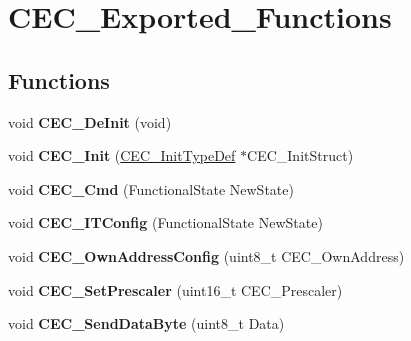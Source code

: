 \hypertarget{group__CEC__Exported__Functions}{
\section{CEC\_\-Exported\_\-Functions}
\label{group__CEC__Exported__Functions}
}
\subsection*{Functions}
\begin{DoxyCompactItemize}
\item 
\hypertarget{group__CEC__Exported__Functions_ga604c3b15b51a46303c201fa3deac2212}{
void {\bfseries CEC\_\-DeInit} (void)}
\label{group__CEC__Exported__Functions_ga604c3b15b51a46303c201fa3deac2212}

\item 
\hypertarget{group__CEC__Exported__Functions_gaf48aee745a16370372b3eaa7cf3ed22b}{
void {\bfseries CEC\_\-Init} (\hyperlink{structCEC__InitTypeDef}{CEC\_\-InitTypeDef} $\ast$CEC\_\-InitStruct)}
\label{group__CEC__Exported__Functions_gaf48aee745a16370372b3eaa7cf3ed22b}

\item 
\hypertarget{group__CEC__Exported__Functions_ga0c8efa79e5768930e567b3b3ed6e09e9}{
void {\bfseries CEC\_\-Cmd} (FunctionalState NewState)}
\label{group__CEC__Exported__Functions_ga0c8efa79e5768930e567b3b3ed6e09e9}

\item 
\hypertarget{group__CEC__Exported__Functions_ga8be87c514505cf82eb29334f054fc0bc}{
void {\bfseries CEC\_\-ITConfig} (FunctionalState NewState)}
\label{group__CEC__Exported__Functions_ga8be87c514505cf82eb29334f054fc0bc}

\item 
\hypertarget{group__CEC__Exported__Functions_gacad422ef1f50246b2021b41835b8a95c}{
void {\bfseries CEC\_\-OwnAddressConfig} (uint8\_\-t CEC\_\-OwnAddress)}
\label{group__CEC__Exported__Functions_gacad422ef1f50246b2021b41835b8a95c}

\item 
\hypertarget{group__CEC__Exported__Functions_gad2fc626e28a82008a29f062975a9af11}{
void {\bfseries CEC\_\-SetPrescaler} (uint16\_\-t CEC\_\-Prescaler)}
\label{group__CEC__Exported__Functions_gad2fc626e28a82008a29f062975a9af11}

\item 
\hypertarget{group__CEC__Exported__Functions_ga6897ab26d8f909f9160e9fac54b97441}{
void {\bfseries CEC\_\-SendDataByte} (uint8\_\-t Data)}
\label{group__CEC__Exported__Functions_ga6897ab26d8f909f9160e9fac54b97441}


\end{DoxyCompactItemize}
